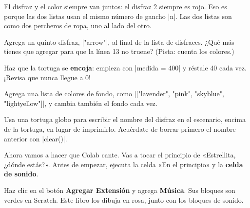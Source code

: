 \begin{think}
El disfraz y el color siempre van juntos: el disfraz 2 siempre es rojo. Eso es porque las dos listas usan el mismo número de gancho \py|n|. Las dos listas son como dos percheros de ropa, uno al lado del otro.
\end{think}

\enlargethispage{\baselineskip}
\begin{challenge}\small
\tick Agrega un quinto disfraz, \py|"arrow"|, al final de la lista de disfraces. ¿Qué más tienes que agregar para que la línea 13 no truene? (Pista: cuenta los colores.)\par
\tick Haz que la tortuga se \textbf{encoja}: empieza con \py|medida = 400| y réstale 40 cada vez. ¡Revisa que nunca llegue a 0!\par
\tick Agrega una lista de colores de fondo, como \py|["lavender", "pink", "skyblue", "lightyellow"]|, y cambia también el fondo cada vez.\par
\tick Usa una tortuga globo para escribir el nombre del disfraz en el escenario, encima de la tortuga, en lugar de imprimirlo. Acuérdate de borrar primero el nombre anterior con \py|clear()|.
\end{challenge}


Ahora vamos a hacer que Colab cante. Vas a tocar el principio de «Estrellita, ¿dónde estás?». Antes de empezar, ejecuta la celda «En el principio» y la \textbf{celda de sonido}.

Haz clic en el botón \textbf{Agregar Extensión} y agrega \textbf{Música}. Sus bloques son verdes en Scratch. Este libro los dibuja en rosa, junto con los bloques de sonido.

\begin{center}
\begin{scratch}
\end{scratch}
\end{center}

